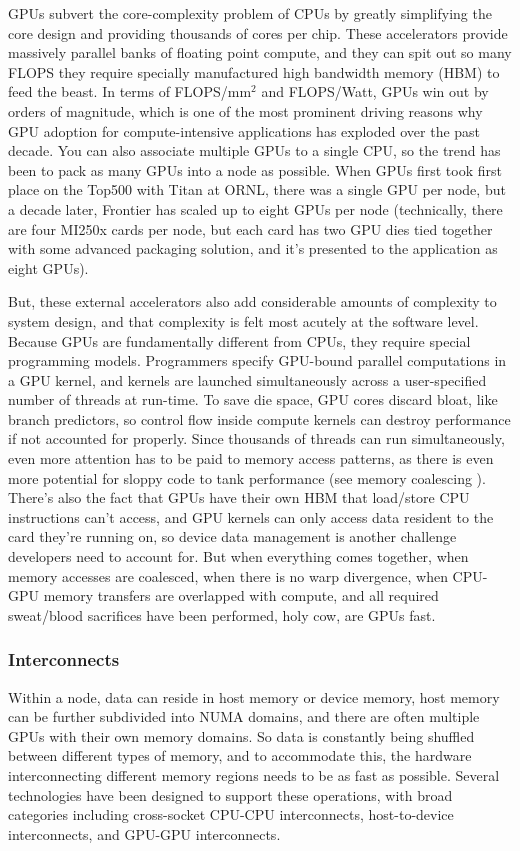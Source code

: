 GPUs subvert the core-complexity problem of CPUs by greatly simplifying the core design and providing thousands of cores per chip. 
These accelerators provide massively parallel banks of floating point compute, and they can spit out so many FLOPS they require specially manufactured high bandwidth memory (HBM) to feed the beast.
In terms of FLOPS/mm$^2$ and FLOPS/Watt, GPUs win out by orders of magnitude, which is one of the most prominent driving reasons why GPU adoption for compute-intensive applications has exploded over the past decade.
You can also associate multiple GPUs to a single CPU, so the trend has been to pack as many GPUs into a node as possible.
When GPUs first took first place on the Top500 with Titan at ORNL, there was a single GPU per node, but a decade later, Frontier has scaled up to eight GPUs per node (technically, there are four MI250x cards per node, but each card has two GPU dies tied together with some advanced packaging solution, and it's presented to the application as eight GPUs).

But, these external accelerators also add considerable amounts of complexity to system design, and that complexity is felt most acutely at the software level.  
Because GPUs are fundamentally different from CPUs, they require special programming models.
Programmers specify GPU-bound parallel computations in a GPU kernel, and kernels are launched simultaneously across a user-specified number of threads at run-time.
To save die space, GPU cores discard bloat, like branch predictors, so control flow inside compute kernels can destroy performance if not accounted for properly.
Since thousands of threads can run simultaneously, even more attention has to be paid to memory access patterns, as there is even more potential for sloppy code to tank performance (see memory coalescing \cite{CUDAMemCoalescing}).
There's also the fact that GPUs have their own HBM that load/store CPU instructions can't access, and GPU kernels can only access data resident to the card they're running on, so device data management is another challenge developers need to account for. 
But when everything comes together, when memory accesses are coalesced, when there is no warp divergence, when CPU-GPU memory transfers are overlapped with compute, and all required sweat/blood sacrifices have been performed, holy cow, are GPUs fast.

\subsubsection{Interconnects}
Within a node, data can reside in host memory or device memory, host memory can be further subdivided into NUMA domains, and there are often multiple GPUs with their own memory domains.
So data is constantly being shuffled between different types of memory, and to accommodate this, the hardware interconnecting different memory regions needs to be as fast as possible.
Several technologies have been designed to support these operations, with broad categories including cross-socket CPU-CPU interconnects, host-to-device interconnects, and  GPU-GPU  interconnects.

